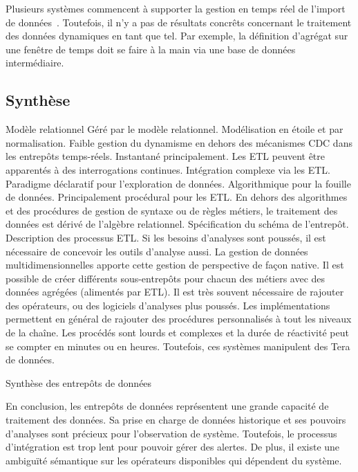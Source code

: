 Plusieurs systèmes commencent à supporter la gestion en temps réel de l'import de données~\cite{Thomsen:rite, Oracle:ODI}. Toutefois, il n'y a pas de résultats concrêts concernant le traitement des données dynamiques en tant que tel. Par exemple, la définition d'agrégat sur une fenêtre de temps doit se faire à la main via une base de données intermédiaire.

\subsection{Synthèse}
\begin{table}[!ht]
\criteretabDonnee
    {Modèle relationnel}
    {Géré par le modèle relationnel. Modélisation en étoile et par normalisation.}
    {Faible gestion du dynamisme en dehors des mécanismes CDC dans les entrepôts temps-réels.}
\criteretabTraitement
    {Instantané principalement. Les ETL peuvent être apparentés à des interrogations continues.}
    {Intégration complexe via les ETL.}
    {Paradigme déclaratif pour l'exploration de données. Algorithmique pour la fouille de données. Principalement procédural pour les ETL.}
    {En dehors des algorithmes et des procédures de gestion de syntaxe ou de règles métiers, le traitement des données est dérivé de l'algèbre relationnel.}
\criteretabAdaptabilite
    {Spécification du schéma de l'entrepôt. Description des processus ETL. Si les besoins d'analyses sont poussés, il est nécessaire de concevoir les outils d'analyse aussi.}
    {La gestion de données multidimensionnelles apporte cette gestion de perspective de façon native. Il est possible de créer différents sous-entrepôts pour chacun des métiers avec des données agrégées (alimentés par ETL).}
    {Il est très souvent nécessaire de rajouter des opérateurs, ou des logiciels d'analyses plus poussés. Les implémentations permettent en général de rajouter des procédures personnalisés à tout les niveaux de la chaîne.}
    {Les procédés sont lourds et complexes et la durée de réactivité peut se compter en minutes ou en heures. Toutefois, ces systèmes manipulent des Tera de données.}
\caption{Synthèse des entrepôts de données}\label{tab:rw:supervision:warehouses:synthese}
\end{table}
En conclusion, les entrepôts de données représentent une grande capacité de traitement des données. Sa prise en charge de données historique et ses pouvoirs d'analyses sont précieux pour l'observation de système. Toutefois, le processus d'intégration est trop lent pour pouvoir gérer des alertes. De plus, il existe une ambiguïté sémantique sur les opérateurs disponibles qui dépendent du système.
